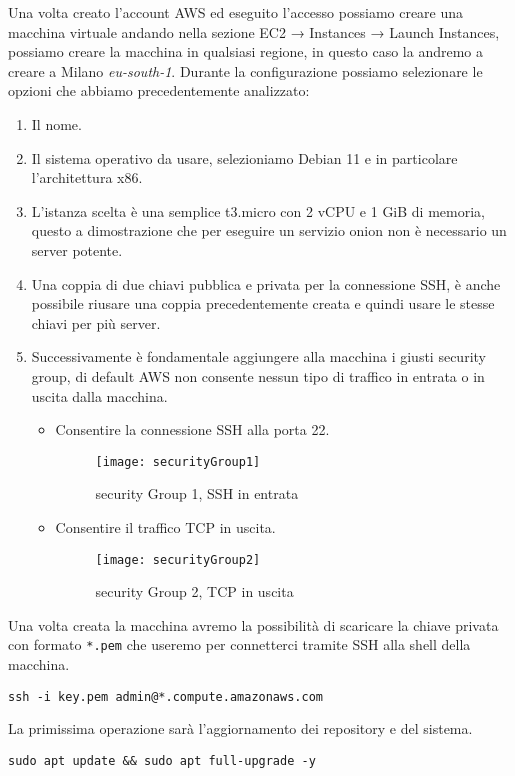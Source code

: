 Una volta creato l'account AWS ed eseguito l'accesso possiamo creare una macchina virtuale andando nella sezione EC2 → Instances → Launch Instances\cite{AwsLaunchInstance}, possiamo creare la macchina in qualsiasi regione, in questo caso la andremo a creare a Milano \emph{eu-south-1}. Durante la configurazione possiamo selezionare le opzioni che abbiamo precedentemente analizzato:
\begin{enumerate}
    \item Il nome.
    \item Il sistema operativo da usare, selezioniamo Debian 11 e in particolare l'architettura x86.
    \item L'istanza scelta è una semplice t3.micro con 2 vCPU e 1 GiB di memoria, questo a dimostrazione che per eseguire un servizio onion non è necessario un server potente.
    \item Una coppia di due chiavi pubblica e privata per la connessione SSH, è anche possibile riusare una coppia precedentemente creata e quindi usare le stesse chiavi per più server.
    \item Successivamente è fondamentale aggiungere alla macchina i giusti security group, di default AWS non consente nessun tipo di traffico in entrata o in uscita dalla macchina.
    \begin{itemize}
        \item Consentire la connessione SSH alla porta 22.
        \begin{figure}[h]
            \centering
            \texttt{[image: securityGroup1]}
            \caption{security Group 1,  SSH in entrata}
            \label{fig:sec1}
        \end{figure}
        
        \item Consentire il traffico TCP in uscita.
        \begin{figure}[h]
            \centering
            \texttt{[image: securityGroup2]}
            \caption{security Group 2, TCP in uscita}
            \label{fig:sec2}
        \end{figure}
    \end{itemize}
\end{enumerate}



Una volta creata la macchina avremo la possibilità di scaricare la chiave privata con formato \lstinline{*.pem} che useremo per connetterci tramite SSH alla shell della macchina.
\begin{lstlisting}[caption={Connessione SSH}]
    ssh -i key.pem admin@*.compute.amazonaws.com
\end{lstlisting}
La primissima operazione sarà l'aggiornamento dei repository e del sistema.
\begin{lstlisting}[caption={Aggiornamento del sistema}]
    sudo apt update && sudo apt full-upgrade -y
\end{lstlisting}

